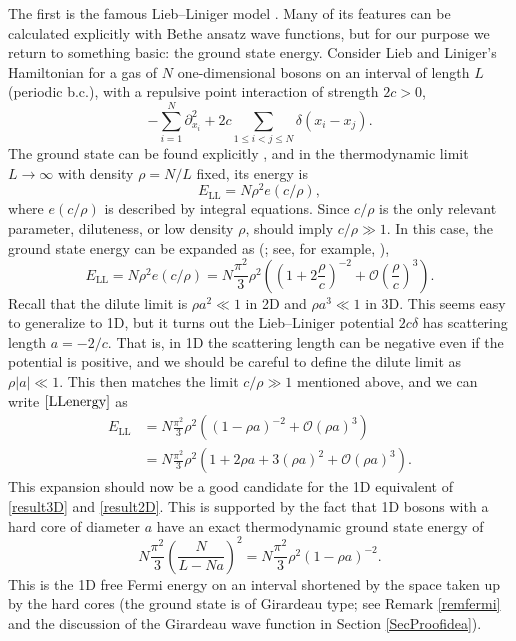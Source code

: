 \documentclass[a4paper,11pt]{article}
\numberwithin{equation}{section}
\begin{document}
The first is the famous Lieb--Liniger model \cite{lieb1963exact}. Many of its features can be calculated explicitly with Bethe ansatz wave functions, but for our purpose we return to something basic: the ground state energy.
Consider Lieb and Liniger's Hamiltonian for a gas of $N$ one-dimensional bosons on an interval of length $L$ (periodic b.c.), with a repulsive point interaction of strength $2c>0$, 
\begin{equation}
\label{LLmodel}
-\sum^N_{i=1}\partial^2_{x_i}+2c\sum_{1\leq i<j\leq N}\delta(x_i-x_j).
\end{equation}
The ground state can be found explicitly \cite{lieb1963exact}, and in the thermodynamic limit $L\to\infty$ with density $\rho=N/L$ fixed, its energy is
\begin{equation}
\label{LLtherm}
E_{\text{LL}}=N\rho^2 e(c/\rho),
\end{equation}
where $e(c/\rho)$ is described by integral equations.
Since $c/\rho$ is the only relevant parameter, diluteness, or low density $\rho$, should imply $c/\rho\gg1$. In this case, the ground state energy can be expanded as (\cite{lieb1963exact}; see, for example, \cite{guan2011polylogs,jiang2015understanding}),
\begin{equation}
\label{LLenergy}
E_{\text{LL}}=N\rho^2 e(c/\rho)=N\frac{\pi^2}{3}\rho^2\left(\left(1+2\frac{\rho}{c}\right)^{-2}+\mathcal{O}\left(\frac{\rho}{c}\right)^3\right).
\end{equation}
Recall that the dilute limit is $\rho a^2\ll1$ in 2D and $\rho a^3\ll1$ in 3D. This seems easy to generalize to 1D, but it turns out the Lieb--Liniger potential $2c\delta$ has scattering length $a=-2/c$. That is, in 1D the scattering length can be negative even if the potential is positive, and we should be careful to define the dilute limit as $\rho|a|\ll1$. This then matches the limit $c/\rho\gg1$ mentioned above, and we can write $\eqref{LLenergy}$ as
\begin{equation}
\label{LLenergyina}
\begin{aligned}
E_{\text{LL}}&=N\frac{\pi^2}{3}\rho^2\left(\left(1-\rho a\right)^{-2}+\mathcal{O}(\rho a)^3\right)\\
&=N\frac{\pi^2}{3}\rho^2\left(1+2\rho a+3(\rho a)^2+\mathcal{O}(\rho a)^3\right).
\end{aligned}
\end{equation}
This expansion should now be a good candidate for the 1D equivalent of \eqref{result3D} and \eqref{result2D}. This is supported by the fact that 1D bosons with a hard core of diameter $a$ have an exact thermodynamic ground state energy of \cite{girardeau1960relationship,astrakharchik2010low}
\begin{equation}
\label{eqhardcore}
N\frac{\pi^2}{3}\left(\frac{N}{L-Na}\right)^2=N\frac{\pi^2}{3}\rho^2\left(1-\rho a\right)^{-2}.
\end{equation}
This is the 1D free Fermi energy on an interval shortened by the space taken up by the hard cores (the ground state is of Girardeau type; see Remark \ref{remfermi} and the discussion of the Girardeau wave function in Section \ref{SecProofidea}).
\end{document}
